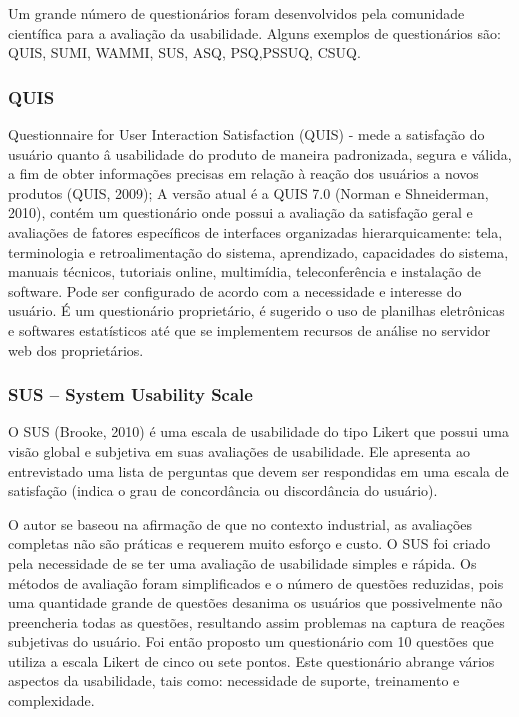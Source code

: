 	Um grande número de questionários foram desenvolvidos pela comunidade científica para a avaliação da usabilidade.  Alguns exemplos de questionários são: QUIS, SUMI,  WAMMI, SUS, ASQ, PSQ,PSSUQ, CSUQ. 


\subsubsection{QUIS}

	Questionnaire for User Interaction Satisfaction (QUIS) - mede a satisfação do usuário quanto â usabilidade do produto de maneira padronizada, segura e válida, a fim de obter informações precisas em relação à reação dos usuários a novos produtos (QUIS, 2009);
	A versão atual é a QUIS 7.0 (Norman e Shneiderman, 2010), contém um questionário onde possui a avaliação da satisfação geral e avaliações de fatores específicos de interfaces organizadas hierarquicamente: tela, terminologia e retroalimentação do sistema, aprendizado, capacidades do sistema, manuais técnicos, tutoriais online, multimídia, teleconferência e instalação de software. Pode ser configurado de acordo com a necessidade e interesse do usuário. 
	É um questionário proprietário, é sugerido o uso de planilhas eletrônicas e softwares estatísticos até que se implementem recursos de análise no servidor web dos proprietários.
	
\subsubsection{SUS – System Usability Scale}

	O SUS (Brooke, 2010) é uma escala de usabilidade do tipo Likert que possui uma visão global e subjetiva em suas avaliações de usabilidade. Ele apresenta ao entrevistado uma lista de perguntas que devem ser respondidas em uma escala de satisfação (indica o grau de concordância ou discordância do usuário). \cite{brooke1996sus}

	O autor se baseou na afirmação de que no contexto industrial, as avaliações completas não são práticas e requerem muito esforço e custo. O SUS foi criado pela necessidade de se ter uma avaliação de usabilidade simples e rápida. Os métodos de avaliação foram simplificados e o número de questões reduzidas, pois uma quantidade grande de questões desanima os usuários que possivelmente não preencheria todas as questões, resultando assim problemas na captura de reações subjetivas do usuário. Foi então proposto um questionário com 10 questões que utiliza a escala Likert de cinco ou sete pontos. Este questionário abrange vários aspectos da usabilidade, tais como: necessidade de suporte, treinamento e complexidade. %


